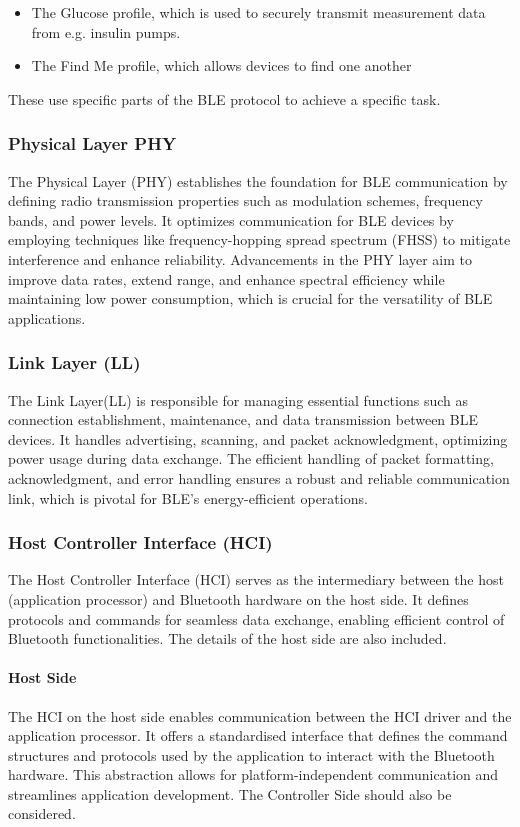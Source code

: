 \begin{itemize}
	\item The Glucose profile, which is used to securely transmit measurement data from e.g. insulin pumps.
	\item The Find Me profile, which allows devices to find one another
\end{itemize}

These use specific parts of the BLE protocol to achieve a specific task.

\subsubsection{Physical Layer PHY}
The Physical Layer (PHY) establishes the foundation for BLE communication by defining radio transmission properties such as modulation schemes, frequency bands, and power levels. It optimizes communication for BLE devices by employing techniques like frequency-hopping spread spectrum (FHSS) to mitigate interference and enhance reliability. Advancements in the PHY layer aim to improve data rates, extend range, and enhance spectral efficiency while maintaining low power consumption, which is crucial for the versatility of BLE applications.

\subsubsection{Link Layer (LL)}
The Link Layer(LL)
is responsible for managing essential functions such as connection establishment, maintenance, and data transmission between BLE devices. It handles advertising, scanning, and packet acknowledgment, optimizing power usage during data exchange. The efficient handling of packet formatting, acknowledgment, and error handling ensures a robust and reliable communication link, which is pivotal for BLE's energy-efficient operations.

\subsubsection{Host Controller Interface (HCI)}
The Host Controller Interface (HCI)
serves as the intermediary between the host (application processor) and Bluetooth hardware on the host side. It defines protocols and commands for seamless data exchange, enabling efficient control of Bluetooth functionalities.
The details of the host side are also included.

\paragraph{Host Side}
The HCI on the host side enables communication between the HCI driver and the application processor. It offers a standardised interface that defines the command structures and protocols used by the application to interact with the Bluetooth hardware. This abstraction allows for platform-independent communication and streamlines application development.
The Controller Side should also be considered.


